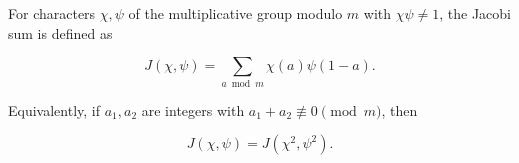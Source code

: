 For characters $\chi, \psi$ of the multiplicative group modulo $m$ with $\chi\psi \neq 1$, the Jacobi sum is defined as

$$J(\chi, \psi) = \sum_{a \bmod m} \chi(a)\psi(1-a).$$

Equivalently, if $a_1, a_2$ are integers with $a_1 + a_2 \not\equiv 0 \pmod{m}$, then

$$J(\chi, \psi) = J(\chi^2, \psi^2).$$
